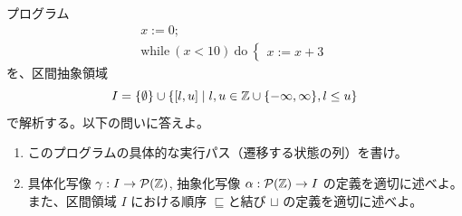 \documentclass[
		head_space=20mm,
		foot_space=20mm,
		gutter=10mm,
		line_length=190mm
]{jlreq}
\begin{document}
\clearpage

\begin{practice}[抽象解釈] %
	プログラム
	\[\begin{array}{l}
		x:=0;\\
		\mathrm{while}~(x<10)~\mathrm{do}~\begin{cases}x:=x+3\end{cases}
	\end{array}\]
	を、区間抽象領域 
	\[I=\{\emptyset\}\cup\{[l,u]\mid l,u\in \mathbb{Z}\cup\{-\infty,\infty\}, l\leq u\}\]
	で解析する。以下の問いに答えよ。
	\begin{enumerate}
		\item このプログラムの具体的な実行パス（遷移する状態の列）を書け。
		\item 具体化写像 $\gamma:I\to\mathcal P(\mathbb{Z})$, 抽象化写像 $\alpha:\mathcal P(\mathbb{Z})\to I$ の定義を適切に述べよ。\\ また、区間領域 $I$ における順序 $\sqsubseteq$と結び $\sqcup$ の定義を適切に述べよ。

\end{enumerate}
\end{practice}
\end{document}
